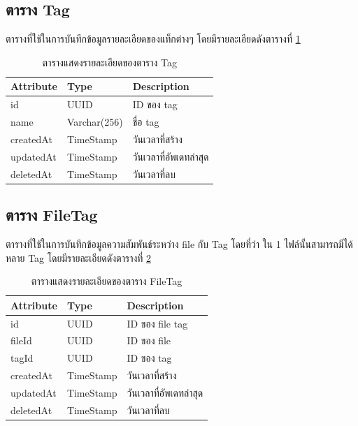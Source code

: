 \documentclass[12pt,oneside,openright,a4paper]{cpe-thai-project}
\begin{document}
\subsection{ตาราง Tag}
ตารางที่ใช้ในการบันทึกข้อมูลรายละเอียดของแท็กต่างๆ โดยมีรายละเอียดดังตารางที่ \ref{tbl:dbTag}
\begin{table}[!ht]
    \centering
    \begin{tabular}{|p{4cm}|p{2cm}|p{6cm}|}
    \hline
    \textbf{Attribute} & \textbf{Type} & \textbf{Description}   \\ \hline
    id                 & UUID          & ID ของ tag             \\ \hline
    name               & Varchar(256)   & ชื่อ tag               \\ \hline
    createdAt          & TimeStamp     & วันเวลาที่สร้าง        \\ \hline
    updatedAt          & TimeStamp     & วันเวลาที่อัพเดทล่าสุด \\ \hline
    deletedAt          & TimeStamp     & วันเวลาที่ลบ       \\ \hline
    \end{tabular}
    \caption{\centering  ตารางแสดงรายละเอียดของตาราง Tag} \label{tbl:dbTag}
\end{table}

\subsection{ตาราง FileTag}
ตารางที่ใช้ในการบันทึกข้อมูลความสัมพันธ์ระหว่าง file กับ Tag โดยที่ว่า ใน 1 ไฟล์นั้นสามารถมีได้หลาย Tag โดยมีรายละเอียดดังตารางที่ \ref{tbl:dbFileTag}
\begin{table}[!ht]
    \centering
    \begin{tabular}{|p{4cm}|p{2cm}|p{6cm}|}
    \hline
    \textbf{Attribute} & \textbf{Type} & \textbf{Description}   \\ \hline
    id                 & UUID          & ID ของ file tag        \\ \hline
    fileId             & UUID          & ID ของ file            \\ \hline
    tagId              & UUID          & ID ของ tag             \\ \hline
    createdAt          & TimeStamp     & วันเวลาที่สร้าง        \\ \hline
    updatedAt          & TimeStamp     & วันเวลาที่อัพเดทล่าสุด \\ \hline
    deletedAt          & TimeStamp     & วันเวลาที่ลบ          \\ \hline
    \end{tabular}
    \caption{\centering  ตารางแสดงรายละเอียดของตาราง FileTag} \label{tbl:dbFileTag}
\end{table}
\end{document}
